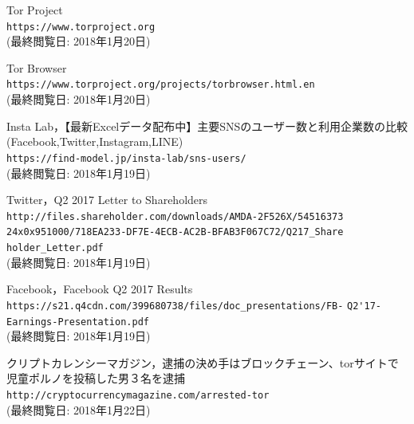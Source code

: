 \documentclass[10pt, a4paper]{jreport}
\begin{document}
\begin{thebibliography}{n}

 Tor Project\\
\verb|https://www.torproject.org|\\
(最終閲覧日: 2018年1月20日)

 Tor Browser\\
\verb|https://www.torproject.org/projects/torbrowser.html.en|\\
(最終閲覧日: 2018年1月20日)


 Insta Lab，【最新Excelデータ配布中】主要SNSのユーザー数と利用企業数の比較(Facebook,Twitter,Instagram,LINE)\\
\verb|https://find-model.jp/insta-lab/sns-users/|\\
(最終閲覧日: 2018年1月19日)

 Twitter，Q2 2017 Letter to Shareholders\\
\verb|http://files.shareholder.com/downloads/AMDA-2F526X/54516373|
\verb|24x0x951000/718EA233-DF7E-4ECB-AC2B-BFAB3F067C72/Q217_Share|
\verb|holder_Letter.pdf|\\
(最終閲覧日: 2018年1月19日)

 Facebook，Facebook Q2 2017 Results\\
\verb|https://s21.q4cdn.com/399680738/files/doc_presentations/FB-|
\verb|Q2'17-Earnings-Presentation.pdf|\\
(最終閲覧日: 2018年1月19日)

 クリプトカレンシーマガジン，逮捕の決め手はブロックチェーン、torサイトで児童ポルノを投稿した男３名を逮捕\\
\verb|http://cryptocurrencymagazine.com/arrested-tor|\\
(最終閲覧日: 2018年1月22日)


\end{thebibliography}
\end{document}
